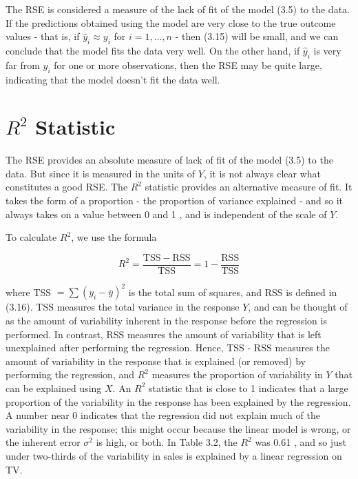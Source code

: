 \documentclass[10pt]{article}
\begin{document}
The RSE is considered a measure of the lack of fit of the model (3.5) to the data. If the predictions obtained using the model are very close to the true outcome values - that is, if $\hat{y}_{i} \approx y_{i}$ for $i=1, \ldots, n$ - then (3.15) will be small, and we can conclude that the model fits the data very well. On the other hand, if $\hat{y}_{i}$ is very far from $y_{i}$ for one or more observations, then the RSE may be quite large, indicating that the model doesn't fit the data well.

\section*{$R^{2}$ Statistic}
The RSE provides an absolute measure of lack of fit of the model (3.5) to the data. But since it is measured in the units of $Y$, it is not always clear what constitutes a good RSE. The $R^{2}$ statistic provides an alternative measure of fit. It takes the form of a proportion - the proportion of variance explained - and so it always takes on a value between 0 and 1 , and is independent of the scale of $Y$.


To calculate $R^{2}$, we use the formula


\begin{equation*}
R^{2}=\frac{\mathrm{TSS}-\mathrm{RSS}}{\mathrm{TSS}}=1-\frac{\mathrm{RSS}}{\mathrm{TSS}} \tag{3.17}
\end{equation*}


where TSS $=\sum\left(y_{i}-\bar{y}\right)^{2}$ is the total sum of squares, and RSS is defined in (3.16). TSS measures the total variance in the response $Y$, and can be thought of as the amount of variability inherent in the response before the regression is performed. In contrast, RSS measures the amount of variability that is left unexplained after performing the regression. Hence, TSS - RSS measures the amount of variability in the response that is explained (or removed) by performing the regression, and $R^{2}$ measures the proportion of variability in $Y$ that can be explained using $X$. An $R^{2}$ statistic that is close to 1 indicates that a large proportion of the variability in the response has been explained by the regression. A number near 0 indicates that the regression did not explain much of the variability in the response; this might occur because the linear model is wrong, or the inherent error $\sigma^{2}$ is high, or both. In Table 3.2, the $R^{2}$ was 0.61 , and so just under two-thirds of the variability in sales is explained by a linear regression on TV.
\end{document}
